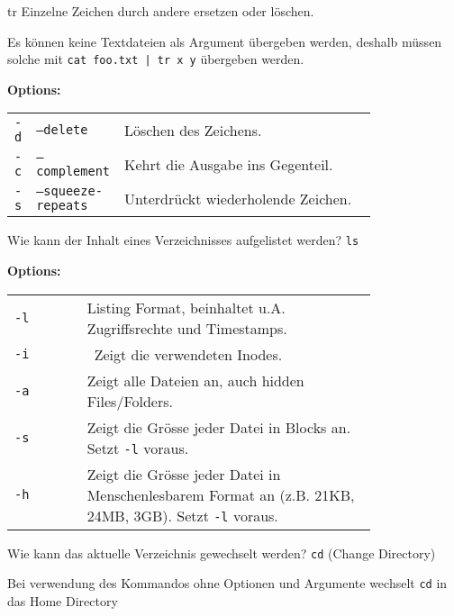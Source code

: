\begin{flashcard}[Command]{tr}
	Einzelne Zeichen durch andere ersetzen oder löschen.
	
	Es können keine Textdateien als Argument übergeben werden, deshalb müssen solche mit \texttt{cat foo.txt | tr x y} übergeben werden.
	
	\textbf{Options:}
	
	\begin{tabular}{llp{0.8\linewidth}}
		\texttt{-d} & \texttt{--delete} & Löschen des Zeichens.\\
		\texttt{-c} & \texttt{--complement} & Kehrt die Ausgabe ins Gegenteil.\\
		\texttt{-s} & \texttt{--squeeze-repeats} & Unterdrückt wiederholende Zeichen.
	\end{tabular}
	
	
\end{flashcard}

\begin{flashcard}[Command]{Wie kann der Inhalt eines Verzeichnisses aufgelistet werden?}
	\texttt{ls}
	
	\textbf{Options:}
	
	\begin{tabular}{lp{0.8\linewidth}}
		\texttt{-l} & Listing Format, beinhaltet u.A. Zugriffsrechte und Timestamps.\\
		\texttt{-i} & Zeigt die verwendeten Inodes.\\
		\texttt{-a} & Zeigt alle Dateien an, auch hidden Files/Folders.\\
		\texttt{-s} & Zeigt die Grösse jeder Datei in Blocks an. Setzt \texttt{-l} voraus.\\
		\texttt{-h} & Zeigt die Grösse jeder Datei in Menschenlesbarem Format an (z.B. 21KB, 24MB, 3GB). Setzt \texttt{-l} voraus.
	\end{tabular}
	
	
\end{flashcard}

\begin{flashcard}[Command]{Wie kann das aktuelle Verzeichnis gewechselt werden?}
	\texttt{cd}	(Change Directory)
	
	Bei verwendung des Kommandos ohne Optionen und Argumente wechselt \texttt{cd} in das Home Directory
	
	
\end{flashcard}


